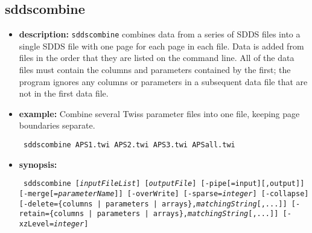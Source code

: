 \newpage
\subsection{sddscombine}
\label{sddscombine}

\begin{itemize}
\item {\bf description:}
\verb|sddscombine| combines data from a series of SDDS files into a single SDDS file with one page for each page in each file.  
Data is added from files in the order that they are listed on the command line.
All of the data files must contain the columns and parameters contained by the first; the program ignores
any columns or parameters in a subsequent data file that are not in the first data file.
\item {\bf example:}
Combine several Twiss parameter files into one file, keeping page boundaries separate.
\begin{flushleft}{\tt
sddscombine APS1.twi APS2.twi APS3.twi APSall.twi 
}\end{flushleft}

\item {\bf synopsis:} 
\begin{flushleft}{\tt
sddscombine [{\em inputFileList}] [{\em outputFile}] [-pipe[=input][,output]]
[-merge[={\em parameterName}]] [-overWrite] [-sparse={\em integer}]
[-collapse]
[-delete=\{columns | parameters | arrays\},{\em matchingString}[,...]]
[-retain=\{columns | parameters | arrays\},{\em matchingString}[,...]]
[-xzLevel={\em integer}]
}\end{flushleft}


\end{itemize}
